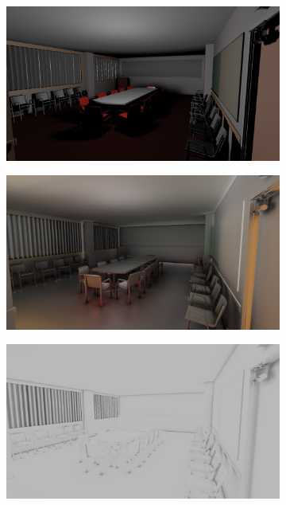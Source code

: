 \begin{figure}[H]
	\centering
	\begin{subfigure}[t]{.49\linewidth}
		\centering
		\captionsetup{justification=centering}
		\includegraphics[width=\linewidth]{media/finals/conf_direct.png}
	\end{subfigure}%
	\hspace{0.01\textwidth}
	\begin{subfigure}[t]{.49\linewidth}
		\centering
		\captionsetup{justification=centering}
		\includegraphics[width=\linewidth]{media/finals/conf_indirect.png}
	\end{subfigure}%
	\par\smallskip
	\begin{subfigure}[t]{.49\linewidth}
		\centering
		\captionsetup{justification=centering}
		\includegraphics[width=\linewidth]{media/finals/conf_ao.png}

\end{subfigure}
\end{figure}
